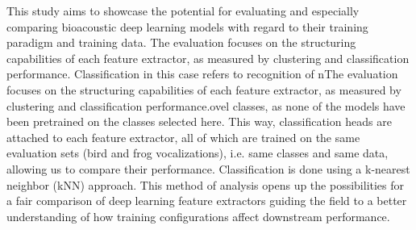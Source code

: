 This study aims to showcase the potential for evaluating and especially comparing bioacoustic deep learning models with regard to their training paradigm and training data.
The evaluation focuses on the structuring capabilities of each feature extractor, as measured by clustering and classification performance.
Classification in this case refers to recognition of nThe evaluation focuses on the structuring capabilities of each feature extractor, as measured by clustering and classification performance.ovel classes, as none of the models have been pretrained on the classes selected here.
This way, classification heads are attached to each feature extractor, all of which are trained on the same evaluation sets (bird and frog vocalizations), i.e. same classes and same data, allowing us to compare their performance.
Classification is done using a k-nearest neighbor (kNN) approach.
This method of analysis opens up the possibilities for a fair comparison of deep learning feature extractors guiding the field to a better understanding of how training configurations affect downstream performance.




